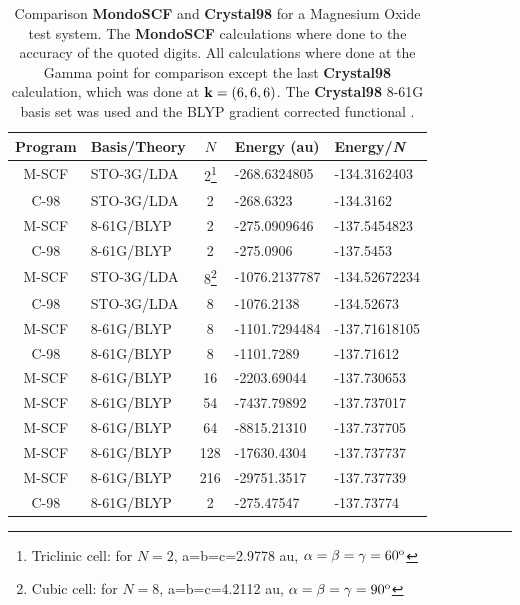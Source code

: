 \documentclass[prb,aps,nobibnotes,twocolumn,doublespace,twocolumngrid,superbib]{revtex4}
\begin{document}
\begin{table}
\caption{Comparison \textbf{MondoSCF} and \textbf{Crystal98} for a 
Magnesium Oxide test system.   The \textbf{MondoSCF} calculations where done to
the accuracy of the quoted digits. All calculations where done at the Gamma point
for comparison except the last \textbf{Crystal98} calculation, which was done at ${\bf k}=(6,6,6)$.
The \textbf{Crystal98} 8-61G  basis set was used \cite{C98Basis} and the BLYP gradient corrected 
functional \cite{Becke92}.}
\label{table:ComToCrystal98_2}

\begin{tabular}{clcll}
\hline 
Program&
Basis/Theory&
\( N \)&
Energy (au)&
Energy/{\it N}\\
\hline
\hline 
M-SCF&
STO-3G/LDA&
2\footnote[1]{Triclinic cell: for $N=2$, a=b=c=2.9778 au, $\alpha=\beta=\gamma=60^{{\rm o}}$}&
-268.6324805 &
-134.3162403 \\
C-98&
STO-3G/LDA&
2\footnotemark[1]&
-268.6323 &
-134.3162 \\
M-SCF&
8-61G/BLYP&
2\footnotemark[1]&
-275.0909646 &
-137.5454823 \\
C-98&
8-61G/BLYP&
2\footnotemark[1]&
-275.0906 &
-137.5453 \\
\hline 
M-SCF&
STO-3G/LDA&
8\footnote[2]{Cubic cell: for $N=8$, a=b=c=4.2112 au, $\alpha=\beta=\gamma=90^{{\rm o}}$}&
-1076.2137787 &
-134.52672234 \\
C-98&
STO-3G/LDA&
8\footnotemark[2]&
-1076.2138 &
-134.52673\\
M-SCF&
8-61G/BLYP&
8\footnotemark[2]&
-1101.7294484 &
-137.71618105\\
C-98&
8-61G/BLYP&
8\footnotemark[2]&
-1101.7289 &
-137.71612  \\
\hline 
M-SCF&
8-61G/BLYP&
16\footnotemark[1]&
-2203.69044 &
-137.730653 \\
M-SCF&
8-61G/BLYP&
54\footnotemark[1]&
-7437.79892 &
-137.737017\\
M-SCF&
8-61G/BLYP&
64\footnotemark[2]&
-8815.21310 &
-137.737705\\
M-SCF&
8-61G/BLYP&
128\footnotemark[1]&
-17630.4304 &
-137.737737 \\
M-SCF&
8-61G/BLYP&
216\footnotemark[2]&
-29751.3517 &
-137.737739 \\
\hline
\,\,C-98\,\,&
8-61G/BLYP\,\,&
\,\,2\footnotemark[1]\,\,&
-275.47547 &
-137.73774  \\ 
\hline
\end{tabular}
\end{table}
%
%
%
\end{document}
